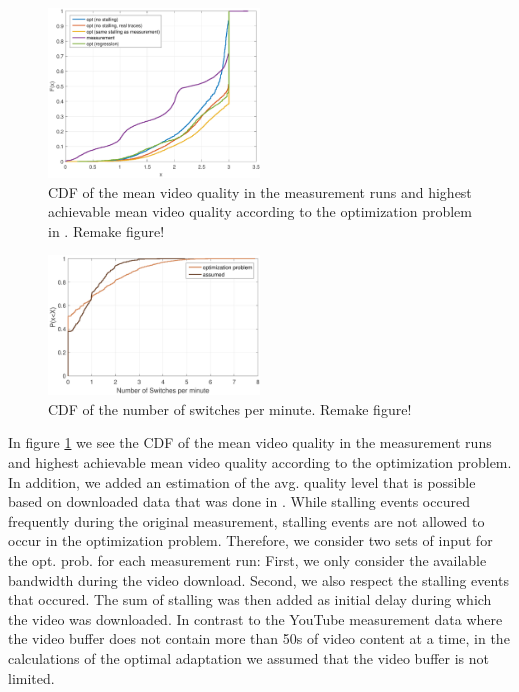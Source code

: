 \begin{figure}[t]
\centering
\includegraphics[width=0.5\textwidth]{figs/quality}%
\caption{CDF of the mean video quality in the measurement runs and highest achievable mean video quality according to the optimization problem in \cite{hossfeld2015identifying}. Remake figure!}
\label{fig:opt}%
\end{figure}

\begin{figure}[t]
\centering
\includegraphics[width=0.5\textwidth]{figs/switches}%
\caption{CDF of the number of switches per minute. Remake figure!}
\label{fig:switches}%
\end{figure}

In figure \ref{fig:opt} we see the CDF of the mean video quality in the measurement runs and highest achievable mean video quality according to the optimization problem. In addition, we added an estimation of the avg. quality level that is possible based on downloaded data that was done in \cite{sieber16sacrificing}. While stalling events occured frequently during the original measurement, stalling events are not allowed to occur in the optimization problem. Therefore, we consider two sets of input for the opt. prob. for each measurement run: First, we only consider the available bandwidth during the video download. Second, we also respect the stalling events that occured. The sum of stalling was then added as initial delay during which the video was downloaded. In contrast to the YouTube measurement data where the video buffer does not contain more than 50s of video content at a time, in the calculations of the optimal adaptation we assumed that the video buffer is not limited.
